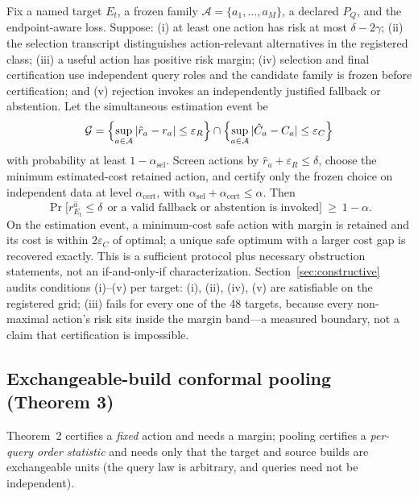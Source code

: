 \documentclass{article}
\renewcommand{\Pr}{\mathop{\mathrm{Pr}}}   %
\newcommand{\Acal}{\mathcal{A}}
\begin{document}
Fix a named target $E_t$, a frozen family $\Acal=\{a_1,\dots,a_M\}$, a declared $P_Q$, and the
endpoint-aware loss. Suppose: (i) at least one action has risk at most $\delta-2\gamma$; (ii) the selection
transcript distinguishes action-relevant alternatives in the registered class; (iii) a useful action has
positive risk margin; (iv) selection and final certification use independent query roles and the candidate
family is frozen before certification; and (v) rejection invokes an independently justified fallback or
abstention. Let the simultaneous estimation event be
\begin{equation}
\mathcal{G}
=\Bigl\{\sup_{a\in\Acal}|\hat r_{a}-r_{a}|\le\varepsilon_{R}\Bigr\}
\cap\Bigl\{\sup_{a\in\Acal}|\hat C_{a}-C_{a}|\le\varepsilon_{C}\Bigr\}
\label{eq:eventG}
\end{equation}
with probability at least $1-\alpha_{\mathrm{sel}}$. Screen actions by $\hat r_{a}+\varepsilon_{R}\le\delta$,
choose the minimum estimated-cost retained action, and certify only the frozen choice on independent data at
level $\alpha_{\mathrm{cert}}$, with $\alpha_{\mathrm{sel}}+\alpha_{\mathrm{cert}}\le\alpha$. Then
\begin{equation}
\Pr\bigl[r_{E_{t}}^{\hat a}\le\delta\ \ \text{or a valid fallback or abstention is invoked}\bigr]\ \ge\ 1-\alpha.
\label{eq:thm2}
\end{equation}
On the estimation event, a minimum-cost safe action with margin is retained and its cost is within
$2\varepsilon_{C}$ of optimal; a unique safe optimum with a larger cost gap is recovered exactly. This is a
sufficient protocol plus necessary obstruction statements, not an if-and-only-if characterization.
Section~\ref{sec:constructive} audits conditions (i)--(v) per target: (i), (ii), (iv), (v) are satisfiable
on the registered grid; (iii) fails for every one of the 48 targets, because every non-maximal action's risk
sits inside the margin band---a measured boundary, not a claim that certification is impossible.

\subsection{Exchangeable-build conformal pooling (Theorem 3)}
\label{sec:thm3}

Theorem~2 certifies a \emph{fixed} action and needs a margin; pooling certifies a
\emph{per-query order statistic} and needs only that the target and source builds are
exchangeable units (the query law is arbitrary, and queries need not be independent).
\end{document}
